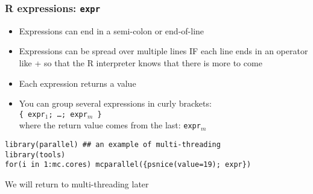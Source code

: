 \documentclass[11pt,pdftex,dvipsnames,usenames,helvetica]{beamer}
\begin{document}
\begin{frame}[fragile]
\frametitle{R expressions: {\tt expr}}
\begin{itemize}
\item Expressions can end in a semi-colon or end-of-line
\item Expressions can be spread over multiple lines IF each
line ends in an operator like + so that the R interpreter
knows that there is more to come
\item Each expression returns a value 
\item You can group several expressions in curly brackets:\\ 
{\tt \{ expr$_1$; \dots; expr$_m$ \}}\\
where the return value comes from the last: {\tt expr$_m$ }
\end{itemize}
\begin{verbatim}
library(parallel) ## an example of multi-threading
library(tools)
for(i in 1:mc.cores) mcparallel({psnice(value=19); expr})
\end{verbatim}
We will return to multi-threading later
\end{frame}
\end{document}

